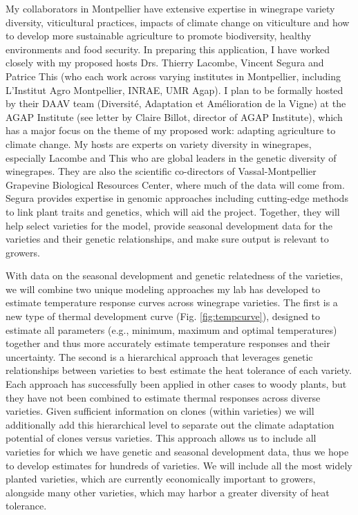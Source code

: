 \documentclass[11pt,letter,oneside]{article}
\begin{document}
My collaborators in Montpellier have extensive expertise in winegrape variety diversity, viticultural practices, impacts of climate change on viticulture and how to develop more sustainable agriculture to promote biodiversity, healthy environments and food security. In preparing this application, I have worked closely with my proposed hosts Drs. Thierry Lacombe, Vincent Segura and Patrice This (who each work across varying institutes in Montpellier, including L'Institut Agro Montpellier, INRAE, UMR Agap). I plan to be formally hosted by their DAAV team (Diversité, Adaptation et Amélioration de la Vigne) at the AGAP Institute (see letter by Claire Billot, director of AGAP Institute), which has a major focus on the theme of my proposed work: adapting agriculture to climate change. My hosts are experts on variety diversity in winegrapes, especially Lacombe and This who are global leaders in the genetic diversity of winegrapes.\cite{lacombe2013large,this2006historical} They are also the scientific co-directors of Vassal-Montpellier Grapevine Biological Resources Center, where much of the data will come from. Segura provides expertise in genomic approaches including cutting-edge methods to link plant traits and genetics,\cite{korte2012mixed,segura2012efficient} which will aid the project. Together, they will help select varieties for the model, provide seasonal development data for the varieties and their genetic relationships, and make sure output is relevant to growers. 

With data on the seasonal development and genetic relatedness of the varieties, we will combine two unique modeling approaches my lab has developed to estimate temperature response curves across winegrape varieties. The first is a new type of thermal development curve (Fig. \ref{fig:tempcurve}), designed to estimate all parameters (e.g., minimum, maximum and optimal temperatures) together and thus more accurately estimate temperature responses and their uncertainty.\cite{betancourt2022} The second is a hierarchical approach\cite{morales2024phylogenetic}  that leverages genetic relationships between varieties to best estimate the heat tolerance of each variety. Each approach has successfully been applied in other cases to woody plants, but they have not been combined to estimate thermal responses across diverse varieties. Given sufficient information on clones (within varieties) we will additionally add this hierarchical level to separate out the climate adaptation potential of clones versus varieties. This approach allows us to include all varieties for which we have genetic and seasonal development data, thus we hope to develop estimates for hundreds of varieties. We will include all the most widely planted varieties, which are currently economically important to growers, alongside many other varieties, which may harbor a greater diversity of heat tolerance. %
\end{document}
